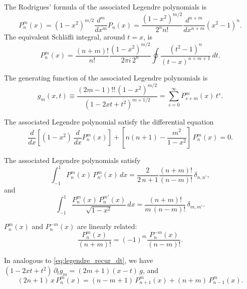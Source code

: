 \documentclass[11pt]{article}
\begin{document}
The Rodrigues' formula of the associated Legendre polynomials is
%
\begin{equation}
  P_n^m(x)
= (1 - x^2)^{m/2}
  \frac{d^m}{dx^m}
  P_n(x)
=
  \frac{(1 - x^2)^{m/2}}{2^n n!}
  \frac{d^{n+m}}{dx^{n+m}}
  (x^2 - 1)^n.
  \label{eq:alegendre_rodrigues}
\end{equation}
%
The equivalent Schl\"{a}fli integral, around $t = x$, is
\begin{equation}
  P_n^m(x)
=
  \frac{ (n + m)! } { n! }
  \frac{ (1 - x^2)^{m/2} }{2\pi i \, 2^n}
  \oint
  \frac{ (t^2 - 1)^n } { (t - x)^{n+m+1} } \, dt.
  \label{eq:alegendre_schlaefli}
\end{equation}

The generating function of the associated Legendre polynomials is
%
\begin{equation}
  g_m(x, t)
\equiv
  \frac{ (2 m - 1)!! \, (1 - x^2)^{m/2} }
  { (1 - 2 x t + t^2)^{m + 1/2} }
=
  \sum_{s = 0}^\infty P_{s+m}^m(x) \, t^s.
  \label{eq:alegendre_gf}
\end{equation}

The associated Legendre polynomial satisfy the differential equation
\begin{equation}
  \frac{d}{dx}
  \left[
    (1 - x^2) \, \frac{d}{dx} P_n^m(x)
  \right]
+
  \left[
    n (n + 1) - \frac{m^2}{1 - x^2}
  \right]
  \, P_n^m(x) = 0.
\label{eq:alegendre_diffeq}
\end{equation}

The associated Legendre polynomials satisfy
\begin{equation}
  \int_{-1}^1
  P_n^m(x) \, P_{n'}^m(x) \, dx
=
  \frac { 2 } { 2 \, n + 1 }
  \frac{ (n + m)! } { (n - m)! }
  \,
  \delta_{n, n'},
  \label{eq:alegendre_orthonormal}
\end{equation}
%
and
%
\begin{equation}
  \int_{-1}^1
  \frac{
    P_n^m(x) \, P_n^{m'}(x)
  } {
    \sqrt{ 1 - x^2 }
  }\, dx
=
  \frac{ (n + m)! } { m \, (n - m)! }
  \,
  \delta_{m, m'}.
  \label{eq:alegendre_orthonormal2}
\end{equation}

$P_n^m(x)$ and $P_n^{-m}(x)$ are linearly related:
\begin{equation}
  \frac{ P_n^m(x) } { (n + m)! }
=
  (-1)^m
  \frac{ P_n^{-m}(x) } { (n - m)! }.
  \label{eq:PnmPnnegm}
\end{equation}

In analogous to \eqref{eq:legendre_recur_dt},
we have
$(1 - 2 x t + t^2) \, \partial_t g_m = (2 m + 1) (x - t) \, g$,
and
\begin{equation}
  (2 n + 1) \, x \, P_n^m(x) = (n - m + 1) \, P_{n+1}^m(x) + (n + m) \, P_{n-1}^m(x).
  \label{eq:alegendre_recur_dt}
\end{equation}
\end{document}
